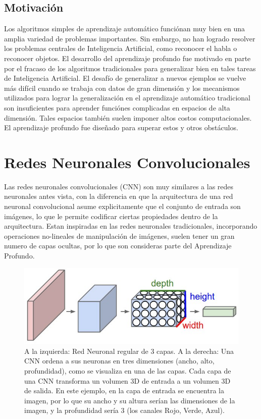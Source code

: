 \documentclass[a4paper,11pt,spanish]{book}
\begin{document}
    \subsection {Motivación}
      Los algoritmos simples de aprendizaje automático funciónan muy bien en una amplia variedad de problemas importantes.
      Sin embargo, no han logrado resolver los problemas centrales de Inteligencia Artificial, como reconocer el habla o reconocer objetos.
      El desarrollo del aprendizaje profundo fue motivado en parte por el fracaso de los algoritmos tradicionales para generalizar bien en tales tareas de Inteligencia Artificial.
      El desafío de generalizar a nuevos ejemplos se vuelve más difícil cuando se trabaja con datos de gran dimensión y los mecanismos utilizados para lograr la generalización
      en el aprendizaje  automático tradicional son insuficientes para aprender funciónes complicadas en espacios de alta dimensión.
      Tales espacios también suelen imponer altos costos computacionales. El aprendizaje profundo fue diseñado para superar estos y otros obstáculos.

  \section {Redes Neuronales Convolucionales}
    Las redes neuronales convolucionales (CNN) son muy similares a las redes neuronales antes vista, con la diferencia en que la arquitectura de una red neuronal convolucional asume explicitamente
    que el conjunto de entrada son imágenes, lo que le permite codificar ciertas propiedades dentro de la arquitectura.
    Estan inspiradas en las redes neuronales tradicionales, incorporando operaciones no-lineales de manipulación de imágenes, suelen tener un gran numero de capas ocultas, por lo que
    son consideras parte del Aprendizaje Profundo.
    \begin{figure}[H]
      \begin{center}
       \includegraphics[width=0.8\linewidth]{./img/stanford_cnn.jpeg}
      \end{center}
      \caption{A la izquierda: Red Neuronal regular de 3 capas. A la derecha: Una CNN ordena a sus neuronas en tres dimensiones (ancho, alto, profundidad), como se visualiza en una de
	las capas. Cada capa de una CNN transforma un volumen 3D de entrada a un volumen 3D de salida. En este ejemplo, en la capa de entrada se encuentra la imagen, por lo que su ancho y su altura
	serían las dimensiones de la imagen, y la profundidad sería 3 (los canales Rojo, Verde, Azul). \cite{Stanford}}
      \label{fig:cnn}
    \end{figure}
\end{document}
